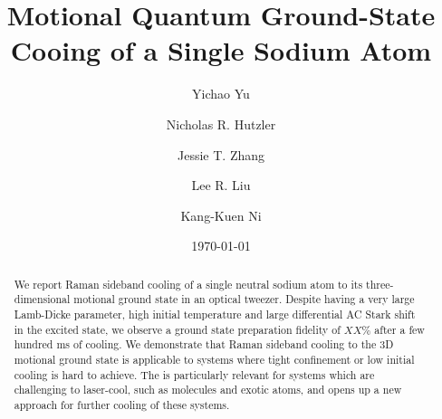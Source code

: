 \documentclass[aps,prl,twocolumn,groupedaddress]{revtex4-1}
\begin{document}
\title{Motional Quantum Ground-State Cooing of a Single Sodium Atom}
\author{Yichao Yu}
\author{Nicholas R. Hutzler}
\author{Jessie T. Zhang}
\author{Lee R. Liu}
\author{Kang-Kuen Ni}

\date{\today}

\begin{abstract}
  We report Raman sideband cooling of a single neutral sodium atom to its three-dimensional
  motional ground state in an optical tweezer.
  Despite having a very large Lamb-Dicke parameter, high initial temperature and
  large differential AC Stark shift in the excited state,
  we observe a ground state preparation fidelity of $XX\%$ after a few hundred ms of cooling.
  We demonstrate that Raman sideband cooling to the 3D motional ground state is applicable to
  systems where tight confinement or low initial cooling is hard to achieve.  The is particularly relevant for systems which are challenging to laser-cool, such as molecules and exotic atoms, and opens up a new approach for further cooling of these systems.
\end{abstract}

\maketitle
\end{document}
